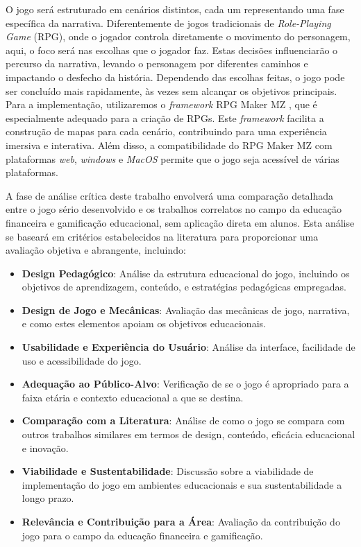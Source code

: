 O jogo será estruturado em cenários distintos, cada um representando uma fase específica da narrativa. Diferentemente de jogos tradicionais de \textit{Role-Playing Game} (RPG), onde o jogador controla diretamente o movimento do personagem, aqui, o foco será nas escolhas que o jogador faz. Estas decisões influenciarão o percurso da narrativa, levando o personagem por diferentes caminhos e impactando o desfecho da história. Dependendo das escolhas feitas, o jogo pode ser concluído mais rapidamente, às vezes sem alcançar os objetivos principais. Para a implementação, utilizaremos o \textit{framework} RPG Maker MZ \cite{RPGMakerMZ}, que é especialmente adequado para a criação de RPGs. Este \textit{framework} facilita a construção de mapas para cada cenário, contribuindo para uma experiência imersiva e interativa. Além disso, a compatibilidade do RPG Maker MZ com plataformas \textit{web}, \textit{windows} e \textit{MacOS} permite que o jogo seja acessível de várias plataformas.

A fase de análise crítica deste trabalho envolverá uma comparação detalhada entre o jogo sério desenvolvido e os trabalhos correlatos no campo da educação financeira e gamificação educacional, sem aplicação direta em alunos. Esta análise se baseará em critérios estabelecidos na literatura para proporcionar uma avaliação objetiva e abrangente, incluindo:

\begin{itemize}
	\item \textbf{Design Pedagógico}: Análise da estrutura educacional do jogo, incluindo os objetivos de aprendizagem, conteúdo, e estratégias pedagógicas empregadas.
	\item \textbf{Design de Jogo e Mecânicas}: Avaliação das mecânicas de jogo, narrativa, e como estes elementos apoiam os objetivos educacionais.
	\item \textbf{Usabilidade e Experiência do Usuário}: Análise da interface, facilidade de uso e acessibilidade do jogo.
	\item \textbf{Adequação ao Público-Alvo}: Verificação de se o jogo é apropriado para a faixa etária e contexto educacional a que se destina.
	\item \textbf{Comparação com a Literatura}: Análise de como o jogo se compara com outros trabalhos similares em termos de design, conteúdo, eficácia educacional e inovação.
	\item \textbf{Viabilidade e Sustentabilidade}: Discussão sobre a viabilidade de implementação do jogo em ambientes educacionais e sua sustentabilidade a longo prazo.
	\item \textbf{Relevância e Contribuição para a Área}: Avaliação da contribuição do jogo para o campo da educação financeira e gamificação.
\end{itemize}

